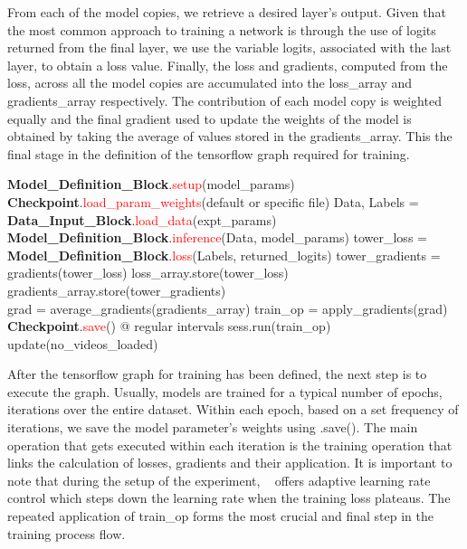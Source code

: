 \documentclass{llncs}
\begin{document}
From each of the model copies, we retrieve a desired layer's output.
Given that the most common approach to training a network is through the use of logits returned from the final layer, we use the variable logits, associated with the last layer, to obtain a loss value.
Finally, the loss and gradients, computed from the loss, across all the model copies are accumulated into the loss\_array and gradients\_array respectively.
The contribution of each model copy is weighted equally and the final gradient used to update the weights of the model is obtained by taking the average of values stored in the gradients\_array.
This the final stage in the definition of the tensorflow graph required for training.

\begin{algorithmic}[H]
\State \textbf{Model\_Definition\_Block}.\textcolor{red}{setup}(model\_params)
\State \textbf{Checkpoint}.\textcolor{red}{load\_param\_weights}(default or specific file)
\State Data, Labels = \textbf{Data\_Input\_Block}.\textcolor{red}{load\_data}(expt\_params)
\\
\State \textbf{Model\_Definition\_Block}.\textcolor{red}{inference}(Data, model\_params)
\State tower\_loss = \textbf{Model\_Definition\_Block}.\textcolor{red}{loss}(Labels, returned\_logits)
\State tower\_gradients = gradients(tower\_loss)
\State loss\_array.store(tower\_loss)
\State gradients\_array.store(tower\_gradients)
\EndFor
\\
\State grad = average\_gradients(gradients\_array)
\State train\_op = apply\_gradients(grad)
\\
\State \textbf{Checkpoint}.\textcolor{red}{save}() @ regular intervals
\State sess.run(train\_op)
\State update(no\_videos\_loaded)
\EndWhile
\EndProcedure
\end{algorithmic}

After the tensorflow graph for training has been defined, the next step is to execute the graph.
Usually, models are trained for a typical number of epochs, iterations over the entire dataset.
Within each epoch, based on a set frequency of iterations, we save the model parameter's weights using \checkpoint.save().
The main operation that gets executed within each iteration is the training operation that links the calculation of losses, gradients and their application.
It is important to note that during the setup of the experiment, \acro~ offers adaptive learning rate control which steps down the learning rate when the training loss plateaus.
The repeated application of train\_op forms the most crucial and final step in the training process flow.
\end{document}
